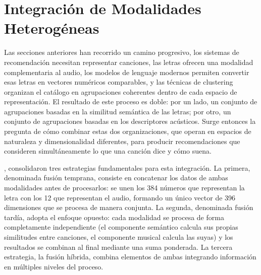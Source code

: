 \section{Integración de Modalidades Heterogéneas}
\label{sec:integracion-multimodal}

Las secciones anteriores han recorrido un camino progresivo, los sistemas de recomendación necesitan representar canciones, las letras ofrecen una modalidad complementaria al audio, los modelos de lenguaje modernos permiten convertir esas letras en vectores numéricos comparables, y las técnicas de clustering organizan el catálogo en agrupaciones coherentes dentro de cada espacio de representación. El resultado de este proceso es doble: por un lado, un conjunto de agrupaciones basadas en la similitud semántica de las letras; por otro, un conjunto de agrupaciones basadas en los descriptores acústicos. Surge entonces la pregunta de cómo combinar estas dos organizaciones, que operan en espacios de naturaleza y dimensionalidad diferentes, para producir recomendaciones que consideren simultáneamente lo que una canción dice y cómo suena.

\textcite{baltrusaitis_2019_multimodal}, consolidaron tres estrategias fundamentales para esta integración. La primera, denominada fusión temprana, consiste en concatenar los datos de ambas modalidades antes de procesarlos: se unen los 384 números que representan la letra con los 12 que representan el audio, formando un único vector de 396 dimensiones que se procesa de manera conjunta. La segunda, denominada fusión tardía, adopta el enfoque opuesto: cada modalidad se procesa de forma completamente independiente (el componente semántico calcula sus propias similitudes entre canciones, el componente musical calcula las suyas) y los resultados se combinan al final mediante una suma ponderada. La tercera estrategia, la fusión híbrida, combina elementos de ambas integrando información en múltiples niveles del proceso.

